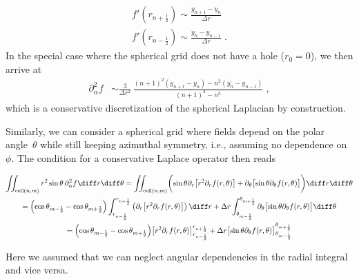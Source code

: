\documentclass[
	superscriptaddress,
	twocolumn,
	aps, pre
]{revtex4-1}
\newcommand{\dr}{\Delta r}
\begin{document}
\begin{subequations}
\begin{align}
	f'\left(r_{n + \frac12}\right) \sim \frac{y_{n+1} - y_n}{\dr}
\\
	f'\left(r_{n - \frac12}\right) \sim \frac{y_n - y_{n-1}}{\dr}
	\;.
\end{align}
\end{subequations}
In the special case where the spherical grid does not have a hole ($r_0=0$), we then arrive at
\begin{align}
	\partial_\alpha^2 f
		&\sim \frac{3}{\dr^2} \, \frac{(n + 1)^2 (y_{n+1} - y_n) - n^2 (y_n - y_{n-1})}{(n + 1)^3 - n^3}
	\;,
\end{align}
which is a conservative discretization of the spherical Laplacian by construction.

Similarly, we can consider a spherical grid where fields depend on the polar angle~$\theta$ while still keeping azimuthal symmetry, i.e., assuming no dependence on $\phi$.
The condition for a conservative Laplace operator then reads
\begin{widetext}
\begin{multline}
	\iint_{\text{cell}(n, m)} r^2 \sin\theta \, \partial_\alpha^2 f  \diff r \diff \theta
=
	\iint_{\text{cell}(n, m)} \biggl(
		\sin\theta  \partial_r\bigl[r^2 \partial_r f(r, \theta)\bigr]
		+ \partial_\theta \bigl[ \sin\theta \partial_\theta  f(r, \theta)\bigr]
	\biggr)\diff r \diff \theta
\\=
	\Bigl(\cos\theta_{m-\frac12} - \cos\theta_{m + \frac12}\Bigr)
		\int_{r_{n - \frac12}}^{r_{n + \frac12}}\left(
			 \partial_r\bigl[r^2 \partial_r f(r, \theta)\bigr]
		\right)  \diff r
	+ \Delta r
		\int_{\theta_{m - \frac12}}^{\theta_{m + \frac12}}
			 \partial_\theta \bigl[ \sin\theta \partial_\theta  f(r, \theta)\bigr]	 \diff\theta
\\=
	\Bigl(\cos\theta_{m-\frac12} - \cos\theta_{m + \frac12}\Bigr)
			\bigl[r^2 \partial_r f(r, \theta)\bigr]_{r_{n - \frac12}}^{r_{n + \frac12}}
	+  \Delta r
		\bigl[ \sin\theta \partial_\theta  f(r, \theta)\bigr]_{\theta_{m - \frac12}}^{\theta_{m + \frac12}}
\end{multline}
\end{widetext}
Here we assumed that we can neglect angular dependencies in the radial integral and vice versa.
\end{document}

